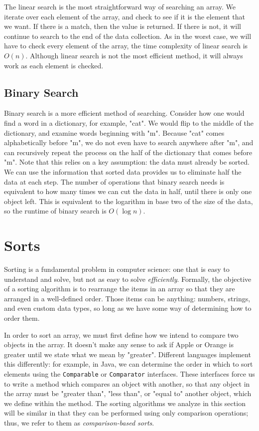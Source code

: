 The linear search is the most straightforward way of searching an array.  We iterate over each element of the array, and check to see if it is the element that we want. If there is a match, then the value is returned. If there is not, it will continue to search to the end of the data collection. As in the worst case, we will have to check every element of the array, the time complexity of linear search is $ O(n) $.  Although linear search is not the most efficient method, it will always work as each element is checked.

\subsection{Binary Search}

Binary search is a more efficient method of searching.  Consider how one would find a word in a dictionary, for example, "cat".  We would flip to the middle of the dictionary, and examine words beginning with "m".  Because "cat" comes alphabetically before "m", we do not even have to search anywhere after "m", and can recursively repeat the process on the half of the dictionary that comes before "m".  Note that this relies on a key assumption: the data must already be sorted.  We can use the information that sorted data provides us to eliminate half the data at each step.  The number of operations that binary search needs is equivalent to how many times we can cut the data in half, until there is only one object left.  This is equivalent to the logarithm in base two of the size of the data, so the runtime of binary search is $ O(\log n) $.

\section{Sorts}

Sorting is a fundamental problem in computer science: one that is easy to understand and solve, but not as easy to solve \textit{efficiently}. Formally, the objective of a sorting algorithm is to rearrange the items in an array so that they are arranged in a well-defined order. Those items can be anything: numbers, strings, and even custom data types, so long as we have some way of determining how to order them.

In order to sort an array, we must first define how we intend to compare two objects in the array.  It doesn't make any sense to ask if Apple or Orange is greater until we state what we mean by "greater".  Different languages implement this differently: for example, in Java, we can determine the order in which to sort elements using the \texttt{Comparable} or \texttt{Comparator} interfaces.  These interfaces force us to write a method which compares an object with another, so that any object in the array must be "greater than", "less than", or "equal to" another object, which we define within the method.  The sorting algorithms we analyze in this section will be similar in that they can be performed using only comparison operations; thus, we refer to them as \textit{comparison-based sorts}.


